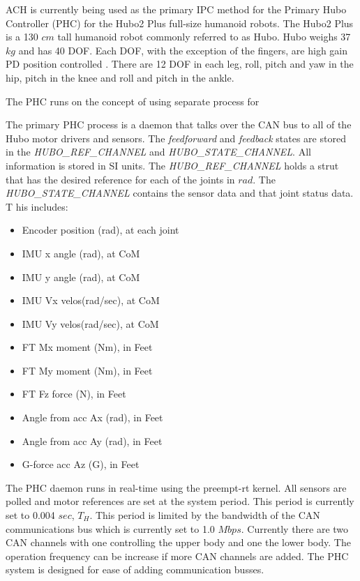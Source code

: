 ACH is currently being used as the primary IPC method for the Primary Hubo Controller (PHC) for the Hubo2 Plus full-size humanoid robots.  
The Hubo2 Plus is a 130 $cm$ tall humanoid robot commonly referred to as Hubo.  
Hubo weighs 37 $kg$ and has 40 DOF.
Each DOF, with the exception of the fingers, are high gain PD position controlled .  
There are 12 DOF in each leg, roll, pitch and yaw in the hip, pitch in the knee and roll and pitch in the ankle.  

The PHC runs on the concept of using separate process for 

The primary PHC process is a daemon that talks over the CAN bus to all of the Hubo motor drivers and sensors.  
The \textit{feedforward} and \textit{feedback} states are stored in the \textit{HUBO\_REF\_CHANNEL} and \textit{HUBO\_STATE\_CHANNEL}.  
All information is stored in SI units.  The \textit{HUBO\_REF\_CHANNEL} holds a strut that has the desired reference for each of the joints in $rad$.  
The \textit{HUBO\_STATE\_CHANNEL} contains the sensor data and that joint status data.  T
his includes:

\begin{itemize}
                \item Encoder position (rad), at each joint
                \item IMU x angle (rad), at CoM
                \item IMU y angle (rad), at CoM
                \item IMU Vx velos(rad/sec), at CoM
                \item IMU Vy velos(rad/sec), at CoM
                \item FT Mx moment (Nm), in Feet
                \item FT My moment (Nm), in Feet
                \item FT Fz force (N), in Feet
                \item Angle from acc Ax (rad), in Feet
                \item Angle from acc Ay (rad), in Feet
                \item G-force acc Az (G), in Feet
\end{itemize}

The PHC daemon runs in real-time using the preempt-rt kernel.  
All sensors are polled and motor references are set at the system period.  
This period is currently set to 0.004 $sec$, $T_H$.  
This period is limited by the bandwidth of the CAN communications bus which is currently set to 1.0 $Mbps$.  
Currently there are two CAN channels with one controlling the upper body and one the lower body.  
The operation frequency can be increase if more CAN channels are added.  
The PHC system is designed for ease of adding communication busses.  


